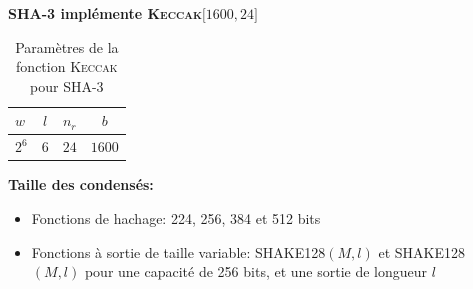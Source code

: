 \begin{frame}
\vfill
   
\centerline{\textbf{SHA-3 implémente \textsc{Keccak}$\lbrack 1600, 24 \rbrack$}}
 
\bgroup
\def\arraystretch{1.5}
  \begin{table}
\begin{tabular}{l | c | c | c }
$w$ & $l$ & $n_r$ & $b$ \\
\hline
$2^6$ & $6$ & $24$ & $1600 $ 
\end{tabular}
\caption{Paramètres de la fonction \textsc{Keccak} pour SHA-3}

\end{table}

\egroup

\vfill

\textbf{Taille des condensés:}
\begin{itemize}
\item{Fonctions de hachage: 224, 256, 384 et 512 bits}
\item{Fonctions à sortie de taille variable: \textsc{SHAKE128}$(M,l)$ et \textsc{SHAKE128}$(M,l)$  pour une capacité de 256 bits, et une sortie de longueur $l$ }
\end{itemize}
\vspace{1cm}
\vfill
\end{frame}
